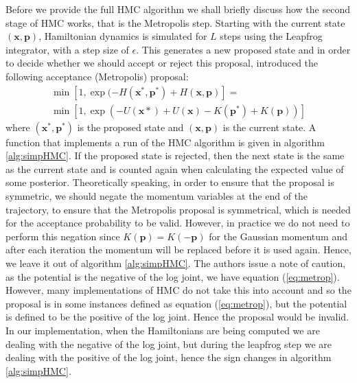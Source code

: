 \documentclass[twoside]{article}
\begin{document}
Before we provide the full HMC algorithm we shall briefly discuss how the second stage of HMC works, that is the Metropolis step. Starting with the current state $(\textbf{x},\textbf{p})$, Hamiltonian dynamics is simulated for $L$ steps using the Leapfrog integrator, with a step size of $\epsilon$. This generates a new proposed state and in order to decide whether we should accept or reject this proposal, \citep{duane1987hybrid} introduced the following acceptance (Metropolis) proposal:
\begin{multline}
\label{eq:metrop}
\min[1, \exp(-H(\textbf{x}^{*}, \textbf{p}^{*}) + H(\textbf{x}, \textbf{p})] =\\
\min[1, \exp(-U(\textbf{x}{*}) + U(\textbf{x}) - K(\textbf{p}^{*}) + K(\textbf{p}))]
\end{multline}where $ (\textbf{x}^{*}, \textbf{p}^{*})$ is the proposed state and $(\textbf{x}, \textbf{p})$ is the current state. A function that implements a run of the HMC algorithm is given in algorithm \ref{alg:simpHMC}. If the proposed state is rejected, then the next state is the same as the current state and is counted again when calculating the expected value of some posterior. 
Theoretically speaking, in order to ensure that the proposal is symmetric, we should negate the momentum variables at the end of the trajectory, to ensure that the Metropolis proposal is symmetrical, which is needed for the acceptance probability to be valid. However, in practice we do not need to perform this negation since $K(\textbf{p}) = K(-\textbf{p})$ for the Gaussian momentum and after each iteration the momentum will be replaced before it is used again. Hence, we leave it out of algorithm \ref{alg:simpHMC}. The authors issue a note of caution, as the potential is the negative of the log joint, we have equation (\ref{eq:metrop}). However, many implementations of HMC do not take this into account and so the proposal is in some instances defined as equation (\ref{eq:metrop}), but the potential is defined to be the positive of the log joint. Hence the proposal would be invalid. In our implementation, when the Hamiltonians are being computed we are dealing with the negative of the log joint, but during the leapfrog step we are dealing with the positive of the log joint, hence the sign changes in algorithm \ref{alg:simpHMC}.  
\end{document}
